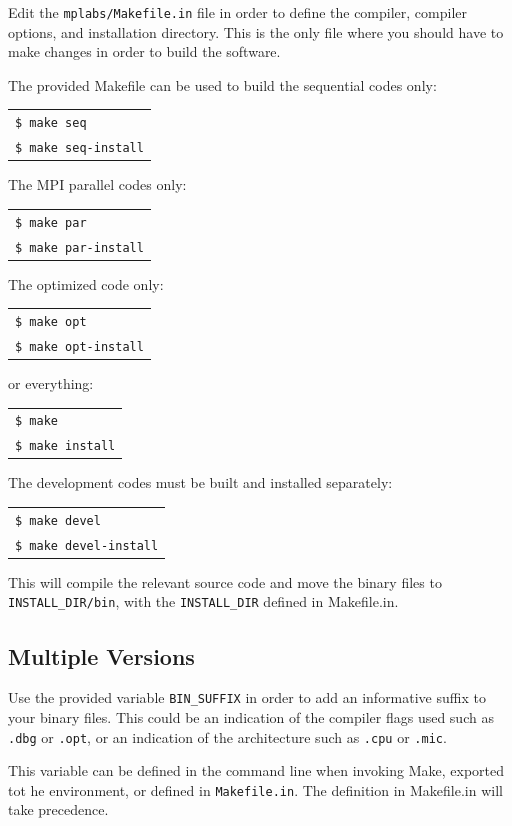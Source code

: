 \documentclass[12pt]{report}
\begin{document}
Edit the \verb+mplabs/Makefile.in+ file in order to define the compiler, compiler options, and installation directory. This is the only file where you should have to make changes in order to build the software.

The provided Makefile can be used to build the sequential codes only:

\begin{tabular}{l}
\texttt{\$ make seq}\\
\texttt{\$ make seq-install}
\end{tabular}

The MPI parallel codes only:

\begin{tabular}{l}
\texttt{\$ make par}\\
\texttt{\$ make par-install}
\end{tabular}

The optimized code only:

\begin{tabular}{l}
\texttt{\$ make opt}\\
\texttt{\$ make opt-install}
\end{tabular}

or everything:

\begin{tabular}{l}
\texttt{\$ make }\\
\texttt{\$ make install}
\end{tabular}

The development codes must be built and installed separately:

\begin{tabular}{l}
\texttt{\$ make devel}\\
\texttt{\$ make devel-install}
\end{tabular}

This will compile the relevant source code and move the binary files to \verb+INSTALL_DIR/bin+, with the \verb+INSTALL_DIR+ defined in Makefile.in.

\subsection{Multiple Versions}
Use the provided variable \verb+BIN_SUFFIX+ in order to add an informative suffix to your binary files. This could be an indication of the compiler flags used such as \verb+.dbg+ or \verb+.opt+, or an indication of the architecture such as \verb+.cpu+ or \verb+.mic+.

This variable can be defined in the command line when invoking Make, exported tot he environment, or defined in \verb+Makefile.in+. The definition in Makefile.in will take precedence.
\end{document}
